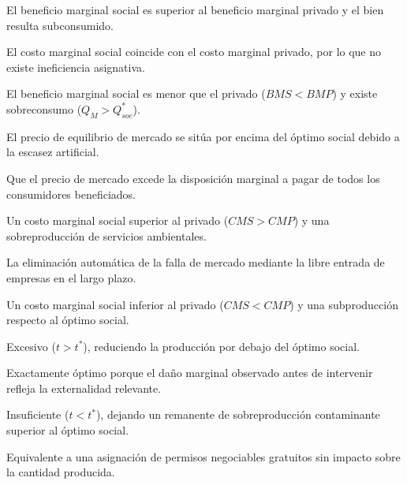 \begin{opts}
    \item El beneficio marginal social es superior al beneficio marginal privado y el bien resulta subconsumido.
    \item El costo marginal social coincide con el costo marginal privado, por lo que no existe ineficiencia asignativa.
    \item El beneficio marginal social es menor que el privado ($BMS < BMP$) y existe sobreconsumo ($Q_M > Q_{soc}^*$).
    \item El precio de equilibrio de mercado se sitúa por encima del óptimo social debido a la escasez artificial.
\end{opts}

\begin{opts}
    \item Que el precio de mercado excede la disposición marginal a pagar de todos los consumidores beneficiados.
    \item Un costo marginal social superior al privado ($CMS > CMP$) y una sobreproducción de servicios ambientales.
    \item La eliminación automática de la falla de mercado mediante la libre entrada de empresas en el largo plazo.
    \item Un costo marginal social inferior al privado ($CMS < CMP$) y una subproducción respecto al óptimo social.
\end{opts}

\begin{opts}
    \item Excesivo ($t > t^*$), reduciendo la producción por debajo del óptimo social.
    \item Exactamente óptimo porque el daño marginal observado antes de intervenir refleja la externalidad relevante.
    \item Insuficiente ($t < t^*$), dejando un remanente de sobreproducción contaminante superior al óptimo social.
    \item Equivalente a una asignación de permisos negociables gratuitos sin impacto sobre la cantidad producida.
\end{opts}

